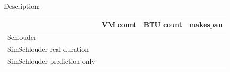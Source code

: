 \documentclass[16pt]{article}
\begin{document}
\title{}
\date{\today}
 
\maketitle
\thispagestyle{plain}

Description: 

\vspace{3cm}
\begin{center}
\begin{tabular}{l|rrr}

				& VM count & BTU count & makespan \\
				 \hline
 Schlouder 			&  \\
 SimSchlouder real duration 	&  \\
 SimSchlouder prediction only	&  \\
 \hline
\end{tabular}
\end{center}

\vspace{3cm}
\end{document}
